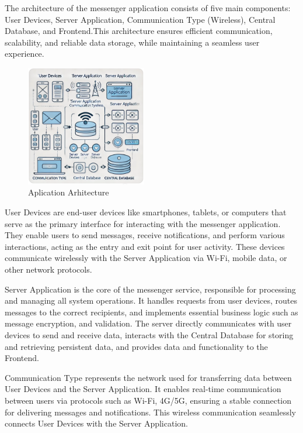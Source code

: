 The architecture of the messenger application consists of five main components: User Devices, Server Application, Communication Type (Wireless), Central Database, and Frontend.This architecture ensures efficient communication, scalability, and reliable data storage, while maintaining a seamless user experience.
\thispagestyle{pagestyle}
\begin{figure}[h]
    \centering
    \includegraphics[width=0.47\textwidth]{images/arhitecture.PNG} %
    \caption{Aplication Arhitecture}
    \label{fig:example}
\end{figure}


User Devices are end-user devices like smartphones, tablets, or computers that serve as the primary interface for interacting with the messenger application. They enable users to send messages, receive notifications, and perform various interactions, acting as the entry and exit point for user activity. These devices communicate wirelessly with the Server Application via Wi-Fi, mobile data, or other network protocols.


Server Application is the core of the messenger service, responsible for processing and managing all system operations. It handles requests from user devices, routes messages to the correct recipients, and implements essential business logic such as message encryption, and validation. The server directly communicates with user devices to send and receive data, interacts with the Central Database for storing and retrieving persistent data, and provides data and functionality to the Frontend.


Communication Type represents the network used for transferring data between User Devices and the Server Application. It enables real-time communication between users via protocols such as Wi-Fi, 4G/5G, ensuring a stable connection for delivering messages and notifications. This wireless communication seamlessly connects User Devices with the Server Application.



